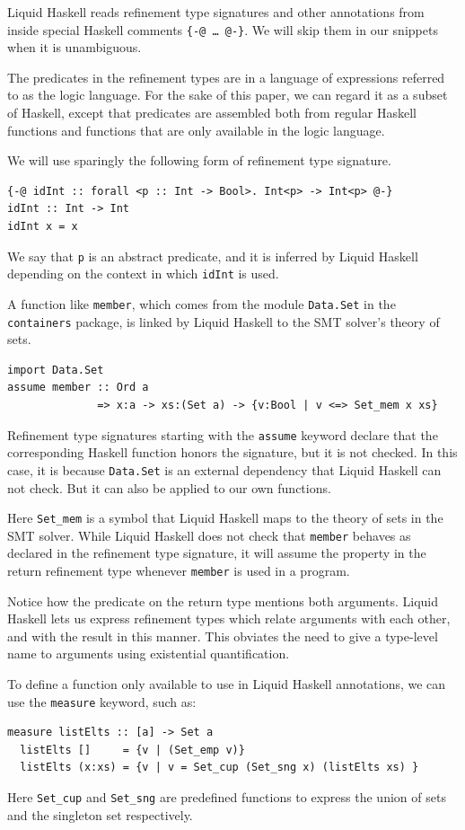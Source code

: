 \documentclass[sigconf]{acmart}
\newcommand{\tc}[1]{{\small\texttt{#1}}}
\begin{document}
Liquid Haskell reads refinement type signatures and other annotations from
inside special Haskell comments
\tc{\{-@ \ldots\ @-\}}. We will skip them in our snippets when it is unambiguous.

The predicates in the refinement types are in a language of expressions
referred to as the logic language. For the sake of this paper, we can
regard it as a subset of Haskell, except that predicates are assembled both from
regular Haskell functions and functions that are
only available in the logic language.

We will use sparingly the following form of refinement type signature.
\begin{verbatim}
{-@ idInt :: forall <p :: Int -> Bool>. Int<p> -> Int<p> @-}
idInt :: Int -> Int
idInt x = x
\end{verbatim}
We say that \tc{p} is an abstract predicate, and it is inferred by Liquid Haskell
depending on the context in which \tc{idInt} is used.

A function like \tc{member}, which comes from the module \tc{Data.Set}
in the \tc{containers} package, is linked by Liquid Haskell to the
SMT solver's theory of sets.
\begin{verbatim}
import Data.Set
assume member :: Ord a
              => x:a -> xs:(Set a) -> {v:Bool | v <=> Set_mem x xs}
\end{verbatim}
Refinement type signatures starting with the \tc{assume} keyword declare that the
corresponding Haskell function honors the signature, but it is not
checked. In this case, it is because \tc{Data.Set} is an external dependency that
Liquid Haskell can not check. But it can also be applied to our own functions.

Here \tc{Set\_mem} is a symbol that Liquid Haskell maps to the theory
of sets in the SMT solver. While Liquid Haskell does not check that
\tc{member} behaves as declared in the refinement type signature,
it will assume the property in the return refinement type
whenever \tc{member} is used in a program.

Notice how the predicate on the return type mentions both arguments. Liquid
Haskell lets us express refinement types which relate arguments with each other,
and with the result in this manner. This obviates the need to
give a type-level name to arguments using existential quantification.

To define a function only available to use in Liquid Haskell annotations,
we can use the \tc{measure} keyword, such as:
\begin{verbatim}
measure listElts :: [a] -> Set a
  listElts []     = {v | (Set_emp v)}
  listElts (x:xs) = {v | v = Set_cup (Set_sng x) (listElts xs) }
\end{verbatim}
Here \tc{Set\_cup} and \tc{Set\_sng} are predefined functions to express the
union of sets and the singleton set respectively.
\end{document}
